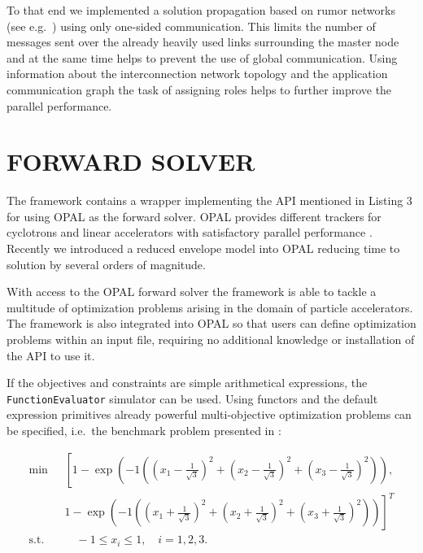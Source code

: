 \documentclass[%
reprint,
amsmath,amssymb,
aps,
]{revtex4-1}
\begin{document}
To that end we implemented a solution propagation based on rumor networks (see
  e.g.\ \cite{bgps:06,ayss:09}) using only one-sided communication.
This limits the number of messages sent over the already heavily used links
  surrounding the master node and at the same time helps to prevent the use of
  global communication.
Using information about the interconnection network topology and the
  application communication graph the task of assigning roles helps to further
  improve the parallel performance.



\section{FORWARD SOLVER} \label{sec:forward-solver}

The framework contains a wrapper implementing the API mentioned in
  Listing 3 for using \textsc{OPAL} \cite{opal} as the forward solver.
\textsc{OPAL} provides different trackers for cyclotrons and linear
  accelerators with satisfactory parallel performance \cite{akir:09}.
Recently we introduced a reduced envelope model \cite{iabc:12} into
  \textsc{OPAL} reducing time to solution by several orders of magnitude.

With access to the \textsc{OPAL} forward solver the framework is able to
  tackle a multitude of optimization problems arising in the domain of
  particle accelerators.
  The framework is also integrated into \textsc{OPAL} so that users can 
  define optimization problems within an input file, requiring no 
  additional knowledge or installation of the API to use it.


If the objectives and constraints are simple arithmetical expressions, the
  \texttt{FunctionEvaluator} simulator can be used.
Using functors and the default expression primitives already powerful
  multi-objective optimization problems can be specified, i.e.\ the benchmark
  problem presented in \cite{hbwh:05}:
%


\begin{flushleft}
\begin{align} \label{eqn:bench}
\text{min} & \left[ 1 - \exp \left( -1 \left(
\left(x_1 - \frac{1}{\sqrt{3}} \right)^2 +
\left(x_2 - \frac{1}{\sqrt{3}} \right)^2 +
\left(x_3 - \frac{1}{\sqrt{3}} \right)^2 \right)\right), \right. \\
& \left. 1 - \exp \left( -1 \left(
\left(x_1 + \frac{1}{\sqrt{3}} \right)^2 +
\left(x_2 + \frac{1}{\sqrt{3}} \right)^2 +
\left(x_3 + \frac{1}{\sqrt{3}} \right)^2 \right)\right) \right]^T \nonumber \\
\text{s.t.} \quad & \quad -1 \le x_i \le 1, \quad i=1,2,3 \nonumber
\text{.}
\end{align}
\end{flushleft}
\end{document}
